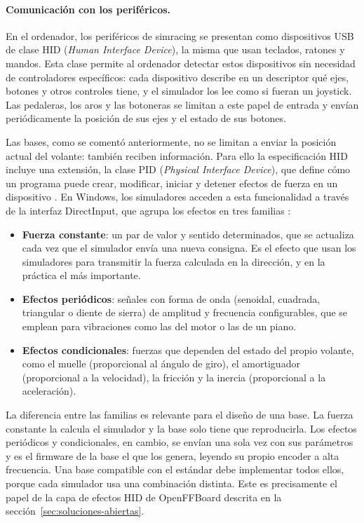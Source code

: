 \paragraph{Comunicación con los periféricos.}
En el ordenador, los periféricos de simracing se presentan como dispositivos USB de clase HID (\textit{Human Interface Device}), la misma que usan teclados, ratones y mandos. Esta clase permite al ordenador detectar estos dispositivos sin necesidad de controladores específicos: cada dispositivo describe en un descriptor qué ejes, botones y otros controles tiene, y el simulador los lee como si fueran un joystick. Las pedaleras, los aros y las botoneras se limitan a este papel de entrada y envían periódicamente la posición de sus ejes y el estado de sus botones.

Las bases, como se comentó anteriormente, no se limitan a enviar la posición actual del volante: también reciben información. Para ello la especificación HID incluye una extensión, la clase PID (\textit{Physical Interface Device}), que define cómo un programa  puede crear, modificar, iniciar y detener efectos de fuerza en un dispositivo \parencite{usb_hid_pid}. En Windows, los simuladores acceden a esta funcionalidad a través de la interfaz DirectInput, que agrupa los efectos en tres familias  \parencite{simracingcockpit_ffb}:
\begin{itemize}
	\item \textbf{Fuerza constante}: un par de valor y sentido determinados, que se actualiza cada vez que el simulador envía una nueva consigna. Es el efecto que usan los simuladores para transmitir la fuerza calculada en la dirección, y en la práctica el más importante.
	\item \textbf{Efectos periódicos}: señales con forma de onda (senoidal, cuadrada, triangular o diente de sierra) de amplitud y frecuencia configurables, que se emplean para vibraciones como las del motor o las de un piano.
	\item \textbf{Efectos condicionales}: fuerzas que dependen del estado del propio volante, como el muelle (proporcional al ángulo de giro), el amortiguador (proporcional a la velocidad), la fricción y la inercia (proporcional a la aceleración).
\end{itemize}

La diferencia entre las familias es relevante para el diseño de una base. La fuerza constante la calcula el simulador y la base solo tiene que reproducirla. Los efectos periódicos y condicionales, en cambio, se envían una sola vez con sus parámetros y es el firmware de la base el que los genera, leyendo su propio encoder a alta frecuencia. Una base compatible con el estándar debe implementar todos ellos, porque cada simulador usa una combinación distinta. Este es precisamente el papel de la capa de efectos HID de OpenFFBoard descrita en la sección~\ref{sec:soluciones-abiertas}.  

